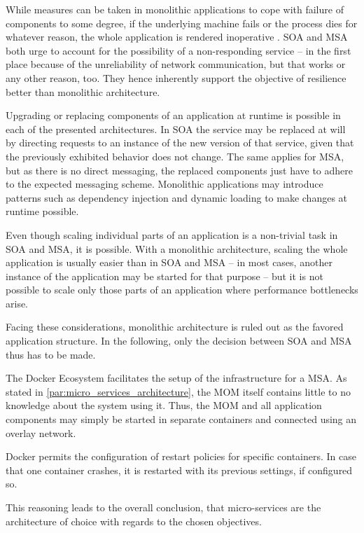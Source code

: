   While measures can be taken in monolithic applications to cope with failure of components to some degree, if the underlying machine fails or the process dies for whatever reason, the whole application is rendered inoperative \cite[p.~55]{Newman2015Building}. \ac{SOA} and \ac{MSA} both urge to account for the possibility of a non-responding service -- in the first place because of the unreliability of network communication, but that works or any other reason, too. They hence inherently support the objective of resilience better than monolithic architecture.

  Upgrading or replacing components of an application at runtime is possible in each of the presented architectures. In \ac{SOA} the service may be replaced at will by directing requests to an instance of the new version of that service, given that the previously exhibited behavior does not change. The same applies for \ac{MSA}, but as there is no direct messaging, the replaced components just have to adhere to the expected messaging scheme. Monolithic applications may introduce patterns such as dependency injection and dynamic loading to make changes at runtime possible.

  Even though scaling individual parts of an application is a non-trivial task in \ac{SOA} and \ac{MSA}, it is possible. With a monolithic architecture, scaling the whole application is usually easier than in \ac{SOA} and \ac{MSA} -- in most cases, another instance of the application may be started for that purpose -- but it is not possible to scale only those parts of an application where performance bottlenecks arise.

  Facing these considerations, monolithic architecture is ruled out as the favored application structure. In the following, only the decision between \ac{SOA} and \ac{MSA} thus has to be made.

  The Docker Ecosystem facilitates the setup of the infrastructure for a \ac{MSA}. As stated in \ref{par:micro_services_architecture}, the \ac{MOM} itself contains little to no knowledge about the system using it. Thus, the \ac{MOM} and all application components may simply be started in separate containers and connected using an overlay network.

  Docker permits the configuration of restart policies for specific containers. In case that one container crashes, it is restarted with its previous settings, if configured so.

  This reasoning leads to the overall conclusion, that micro-services are the architecture of choice with regards to the chosen objectives.


